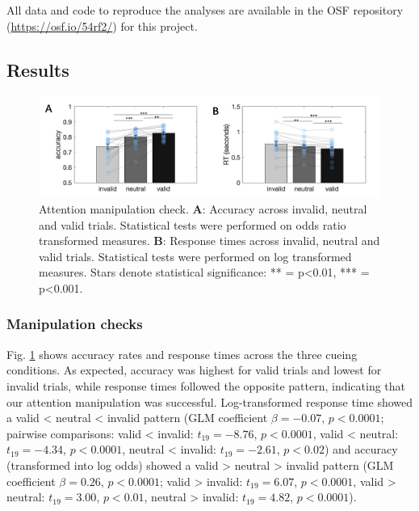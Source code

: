 \documentclass[a4paper, nobind]{templates/ociamthesis}
\begin{document}
All data and code to reproduce the analyses are available in the OSF repository (\url{https://osf.io/54rf2/}) for this project.

\hypertarget{results-5}{%
\subsection{Results}\label{results-5}}

\begin{figure}

{\centering \includegraphics[width=1\linewidth]{figures/distr-man-check} 

}

\caption[Experiment 3, Attention manipulation check]{Attention manipulation check. $\textbf{A:}$ Accuracy across invalid, neutral and valid trials. Statistical tests were performed on odds ratio transformed measures. $\textbf{B:}$ Response times across invalid, neutral and valid trials. Statistical tests were performed on log transformed measures. Stars denote statistical significance: ** = p<0.01, *** = p<0.001.}\label{fig:distr-man-check}
\end{figure}

\hypertarget{manipulation-checks-1}{%
\subsubsection{Manipulation checks}\label{manipulation-checks-1}}

Fig. \ref{fig:distr-man-check} shows accuracy rates and response times across the three cueing conditions. As expected, accuracy was highest for valid trials and lowest for invalid trials, while response times followed the opposite pattern, indicating that our attention manipulation was successful. Log-transformed response time showed a valid \textless{} neutral \textless{} invalid pattern (GLM coefficient \(\beta=-0.07\), \(p<0.0001\); pairwise comparisons: valid \textless{} invalid: \(t_{19}=-8.76\), \(p<0.0001\), valid \textless{} neutral: \(t_{19}=-4.34\), \(p<0.0001\), neutral \textless{} invalid: \(t_{19}=-2.61\), \(p<0.02\)) and accuracy (transformed into log odds) showed a valid \textgreater{} neutral \textgreater{} invalid pattern (GLM coefficient \(\beta=0.26\), \(p<0.0001\); valid \textgreater{} invalid: \(t_{19}=6.07\), \(p<0.0001\), valid \textgreater{} neutral: \(t_{19}=3.00\), \(p<0.01\), neutral \textgreater{} invalid: \(t_{19}=4.82\), \(p<0.0001\)).
\end{document}
